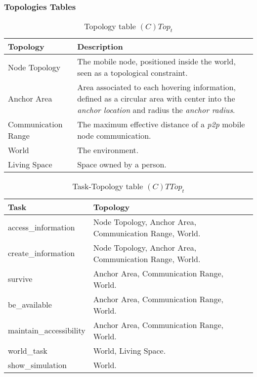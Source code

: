 \subsubsection{Topologies Tables}

\begin{table}[H]
	\centering
	\begin{tabular}{|p{4cm}|p{8cm}|}
			\hline
			\textbf{Topology} & \textbf{Description} \\
			\hline
			Node Topology & The mobile node, positioned inside the world, seen
			as a topological constraint. \\
			\hline
			Anchor Area & Area associated to each hovering information, defined as a
			circular area with center into the \emph{anchor location} and radius the
			\emph{anchor radius}.\\
			\hline
			Communication Range & The maximum effective distance of a \emph{p2p}
			mobile node communication. \\
			\hline
			World & The environment. \\
			\hline
			Living Space & Space owned by a person. \\
			\hline
		\end{tabular}
	\caption{Topology table $(C)Top_t$}
	\label{tab:ctopt}
\end{table}

\begin{table}[H]
	\centering
	\begin{tabular}{|p{4cm}|p{8cm}|}
			\hline
			\textbf{Task} & \textbf{Topology} \\
			\hline
			access\_information& Node Topology, Anchor Area, Communication Range, World.\\
			\hline
			create\_information & Node Topology, Anchor Area, Communication Range, World.\\
			\hline
			survive & Anchor Area, Communication Range, World. \\
			\hline
			be\_available & Anchor Area, Communication Range, World. \\
			\hline
			maintain\_accessibility & Anchor Area, Communication Range, World. \\
			\hline
			world\_task & World, Living Space. \\
			\hline
			show\_simulation & World. \\
			\hline
		\end{tabular}
		\caption{Task-Topology table $(C)TTop_t$}
	\label{tab:cttopt}
\end{table}

